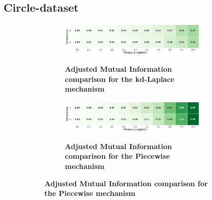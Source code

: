 \subsection{Circle-dataset}
\begin{figure}[H]
  \centering
  \begin{subfigure}[b]{0.85\textwidth}
    \begin{subfigure}[c]{1\textwidth}
      \caption{\textbf{Adjusted Mutual Information comparison for the kd-Laplace mechanism}}
      \includegraphics[width=1\textwidth]{Results/kd-laplace/kd-Laplace/circle-dataset/ami.png}
      \label{fig:ami_circle-dataset_comparison_kdlaplace_2d}
    \end{subfigure}
    \vfill %
    \begin{subfigure}[c]{1\textwidth}
      \caption{\textbf{Adjusted Mutual Information comparison for the Piecewise mechanism}}
      \includegraphics[width=1\textwidth]{Results/kd-laplace/piecewise/circle-dataset/ami.png}
      \label{fig:ami_circle-dataset_comparison_piecewise_2d}
    \end{subfigure}
  \end{subfigure}
  \hfill %
  \begin{subfigure}[b]{0.075\textwidth}

\end{subfigure}
\end{figure}
